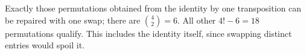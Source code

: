 Exactly those permutations obtained from the identity by one transposition can be repaired with one swap; there are $\binom42=6$. All other $4!-6=\boxed{18}$ permutations qualify. This includes the identity itself, since swapping distinct entries would spoil it.
